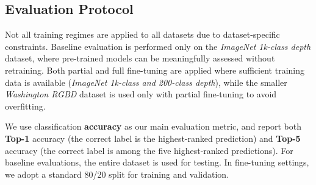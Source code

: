 \subsection{Evaluation Protocol}

Not all training regimes are applied to all datasets due to dataset-specific constraints. Baseline evaluation is performed only on the \textit{ImageNet 1k-class depth} dataset, where pre-trained models can be meaningfully assessed without retraining. Both partial and full fine-tuning are applied where sufficient training data is available (\textit{ImageNet 1k-class and 200-class depth}), while the smaller \textit{Washington RGBD} dataset is used only with partial fine-tuning to avoid overfitting.

We use classification \textbf{accuracy} as our main evaluation metric, and report both \textbf{Top-1} accuracy (the correct label is the highest-ranked prediction) and \textbf{Top-5} accuracy (the correct label is among the five highest-ranked predictions). For baseline evaluations, the entire dataset is used for testing. In fine-tuning settings, we adopt a standard 80/20 split for training and validation.